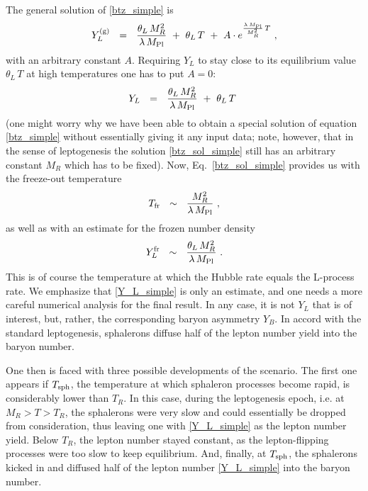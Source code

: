 \documentclass[12pt]{revtex4}
\newcommand{\Mpl}{M_{\rm Pl}}
\newcommand{\Tfr}{T_{\rm fr}}
\newcommand{\Tsph}{T_{\rm sph}}
\begin{document}
	The general solution of \eqref{btz_simple} is
\[
	Y_L^{(\rm g)} ~~=~~ \frac{\theta_L\,M_R^2}{\lambda\,\Mpl}
		~+~ \theta_L\,T ~+~
		A\cdot e^{\frac{\lambda\, \Mpl}{M_R^2}\, T}~,
\]
	with an arbitrary constant $ A $.
	Requiring $ Y_L $ to stay close to its equilibrium value 
	$ \theta_L\, T $ at high temperatures one has to 
	put $ A = 0 $:
\begin{equation}
\label{btz_sol_simple}
	Y_L ~~=~~ \frac{\theta_L\,M_R^2}{\lambda\,\Mpl}
		~+~ \theta_L\,T ~
\end{equation}
	(one might worry why we have been able to obtain a special
	solution of equation \eqref{btz_simple} without essentially giving it
	any input data; note, however, that in the sense of leptogenesis
	the solution \eqref{btz_sol_simple} still has an arbitrary
	constant $ M_R $ which has to be fixed).
	Now, Eq.~\eqref{btz_sol_simple} provides us with the freeze-out
	temperature
\begin{equation}
\label{T_R}
	\Tfr ~~\sim~~ \frac{M_R^2}{\lambda\,\Mpl}~,
\end{equation}
	as well as with an estimate for the frozen number density
\begin{equation}
\label{Y_L_simple}
	Y_L^{\rm fr} ~~\sim~~ \frac{\theta_L\,M_R^2}{\lambda\,\Mpl}~.
\end{equation}
	This is of course the temperature at which the Hubble rate equals 
	the L-process rate.
	We emphasize that \eqref{Y_L_simple} is only an estimate, 
	and one needs a more careful numerical analysis for the final
	result.
	In any case, it is not $ Y_L $ that is of interest, but, rather,
	the corresponding baryon asymmetry $ Y_B $.
	In accord with the standard leptogenesis, sphalerons diffuse
	half of the lepton number yield into the baryon number.


	One then is faced with three possible developments of the scenario.
	The first one appears if $ \Tsph $, the temperature at which
	sphaleron processes become rapid, is considerably lower than $ T_R $.
	In this case, during the leptogenesis epoch, 
	i.e. at $ M_R > T > T_R $,
	the sphalerons were very slow and could essentially be dropped 
	from consideration,
	thus leaving one with \eqref{Y_L_simple} as the lepton number yield.
	Below $ T_R $, the lepton number stayed constant, as the 
	lepton-flipping processes were too slow to keep equilibrium.
	And, finally, at $ \Tsph $, the sphalerons kicked in and diffused
	half of the lepton number \eqref{Y_L_simple} into the baryon number.
\end{document}
